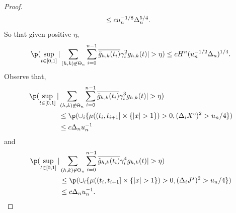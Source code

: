 \begin{proof}
\begin{align}
  & \le  c u^{-1/8}_n \Delta_n^{5/4}\notag.
  \label{}
\end{align}
So that given positive $\eta$,
\begin{align} 
  \p( \sup_{t \in \domain}\vert \sumnt \sumin \btghki \gamma^2_i \ghk(t)\vert > \eta) \le cH^n (u^{-1/2}_n\Delta_n)^{1/4}. \notag \end{align}
Observe that, 
\begin{align}
\p( \sup_{t \in \domain}\vert &\sumnt \sumin \btghki \gamma^3_i  \ghk(t)\vert > \eta) \notag \\
&\le \p(    \cup_i\{ \mu( (t_i, t_{i+1}] \times \{\vert x \vert > 1 \} ) > 0,  (\dxc)^2 > u_n/4\}) \notag \\ & \le c \Delta_n u_n^{-1} \notag\end{align}
and
\begin{align}
\p( \sup_{t \in \domain}\vert &\sumnt \sumin \btghki \gamma^4_i  \ghk(t)\vert > \eta) \notag \\
&\le \p(    \cup_i\{ \mu( (t_i, t_{i+1}] \times \{\vert x \vert > 1 \} ) > 0,  (\djt)^2 > u_n/4\}) \notag \\ & \le c \Delta_n u_n^{-1}.\notag\end{align}

\begin{comment}


\end{comment}
\end{proof}

